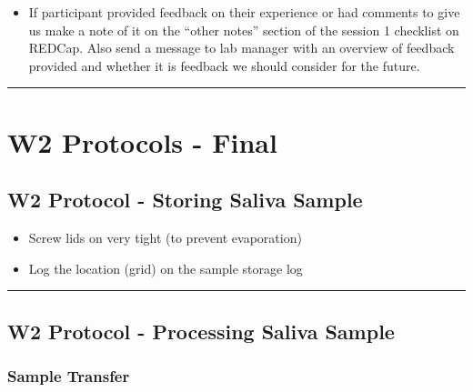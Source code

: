 \documentclass[
]{book}
\providecommand{\tightlist}{%
  \setlength{\itemsep}{0pt}\setlength{\parskip}{0pt}}
\begin{document}
\begin{itemize}
\tightlist
\item
  If participant provided feedback on their experience or had comments to give us make a note of it on the ``other notes'' section of the session 1 checklist on REDCap. Also send a message to lab manager with an overview of feedback provided and whether it is feedback we should consider for the future.
\end{itemize}

\begin{center}\rule{0.5\linewidth}{0.5pt}\end{center}

\hypertarget{w2-protocols---final}{%
\section{W2 Protocols - Final}\label{w2-protocols---final}}

\hypertarget{w2-protocol---storing-saliva-sample}{%
\subsection{W2 Protocol - Storing Saliva Sample}\label{w2-protocol---storing-saliva-sample}}

\begin{itemize}
\tightlist
\item
  Screw lids on very tight (to prevent evaporation)
\item
  Log the location (grid) on the sample storage log
\end{itemize}

\begin{center}\rule{0.5\linewidth}{0.5pt}\end{center}

\hypertarget{w2-protocol---processing-saliva-sample}{%
\subsection{W2 Protocol - Processing Saliva Sample}\label{w2-protocol---processing-saliva-sample}}

\hypertarget{sample-transfer-2}{%
\subsubsection{Sample Transfer}\label{sample-transfer-2}}
\end{document}

